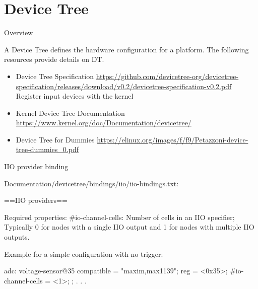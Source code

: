 \section{Device Tree}

\begin{frame}
    {Overview}

	A Device Tree defines the hardware configuration for a platform. The following resources provide details on DT.
\begin{itemize}
	\item
		Device Tree Specification
		\url{https://github.com/devicetree-org/devicetree-specification/releases/download/v0.2/devicetree-specification-v0.2.pdf}
		Register input devices with the kernel
	\item
		Kernel Device Tree Documentation
		\url{https://www.kernel.org/doc/Documentation/devicetree/}
	\item
		Device Tree for Dummies
		\url{https://elinux.org/images/f/f9/Petazzoni-device-tree-dummies_0.pdf}
\end{itemize}
\end{frame}

\begin{frame}
	{IIO provider binding}

	Documentation/devicetree/bindings/iio/iio-bindings.txt:

	\begin{raw}
==IIO providers==

Required properties:
#io-channel-cells: Number of cells in an IIO specifier; Typically 0 for nodes
                   with a single IIO output and 1 for nodes with multiple
                   IIO outputs.

Example for a simple configuration with no trigger:

        adc: voltage-sensor@35 {
                compatible = "maxim,max1139";
                reg = <0x35>;
                #io-channel-cells = <1>;
        };
	.
	.
	.
	\end{raw}
\end{frame}

